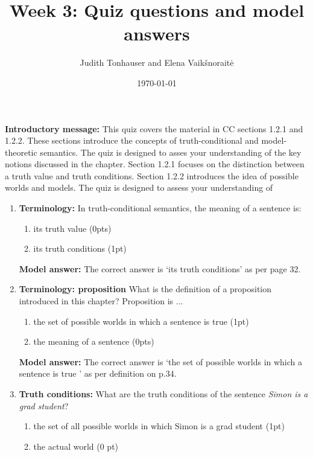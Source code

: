 \documentclass[a4,11pt]{article}
\title{Week 3: Quiz questions and model answers}
\author{Judith Tonhauser and Elena Vaik\v snorait\.{e} }
\date{\today}
\begin{document}
\maketitle


{\bf Introductory message:} This quiz covers the material in CC sections 1.2.1 and 1.2.2. These sections introduce the concepts of truth-conditional and model-theoretic semantics. The quiz is designed to asses your understanding of the key notions discussed in the chapter. Section 1.2.1 focuses on the distinction between a truth value and truth conditions. Section 1.2.2 introduces the idea of possible worlds and models. The quiz is designed to assess your understanding of  


\begin{enumerate}[leftmargin = 12pt]

  \item {\bf Terminology:}  In truth-conditional semantics, the meaning of a sentence is:
         \begin{enumerate}[noitemsep]
       \item its truth value (0pts) 
        \item its truth conditions (1pt)
   \end{enumerate}
   
 {\bf Model answer:} The correct answer is `its truth conditions' as per page 32.

   \item {\bf Terminology: proposition}  What is the definition of a proposition introduced in this chapter? Proposition is ...
       \begin{enumerate}[noitemsep]
       \item the set of possible worlds in which a sentence is true (1pt) 
        \item the meaning of a sentence (0pts)
   \end{enumerate}
  
     {\bf Model answer:} The correct answer is `the set of possible worlds in which a sentence is true ' as per definition on p.34.

   \item {\bf Truth conditions:}   What are the truth conditions of the sentence \textit{Simon is a grad student}?
       \begin{enumerate}[noitemsep]
       \item the set of all possible worlds in which Simon is a grad student (1pt)
        \item the actual world (0 pt)
    \end{enumerate}     
        

\end{enumerate}
\end{document}

